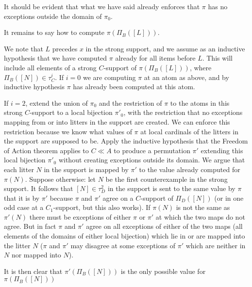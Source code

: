 \documentclass[12pt]{article}
\begin{document}
It should be evident that what we have said already enforces that $\pi$ has no exceptions outside the domain of $\pi_0$.

It remains to say how to compute $\pi(\Pi_B([L]))$.

We note that $L$ precedes $x$ in the strong support, and we assume as an inductive hypothesis that we have computed $\pi$ already for all items before $L$.
This will include all elements of a strong $C$-support of $\pi(\Pi_B([L]))$, where $\Pi_B([N]) \in \tau^i_C$.  If $i=0$ we are computing $\pi$ at an atom as above, and
by inductive hypothesis $\pi$ has already been computed at this atom.

If $i=2$, extend the union of $\pi_0$ and the restriction of $\pi$ to the atoms in this strong $C$-support to a local bijection $\pi'_0$, with the restriction
that no exceptions mapping from or into litters in the support are created.  We can enforce this restriction because we know what values of $\pi$ at local cardinals of the litters in the support are supposed to be.  Apply the inductive hypothesis that the Freedom of Action theorem applies to $C\ll A$ to produce
a permutation $\pi'$ extending this local bijection $\pi'_0$ without creating exceptions outside its domain.   We argue that each litter $N$ in the support is mapped by $\pi'$ to the value
already computed for $\pi(N)$.  Suppose otherwise:  let $N$ be the first counterexample in the strong support.  It follows that $[N]\in \tau^2_D$ in the support is sent to the same value by $\pi$ that it is by $\pi'$ because $\pi$ and $\pi'$ agree on a $C$-support of $\Pi_D([N])$ (or in one odd case at a $C_1$-support, but this also works).  If $\pi(N)$ is not the same as $\pi'(N)$ there must be exceptions of either $\pi$ or $\pi'$ at which the two maps do not agree.  But in fact $\pi$ and $\pi'$ agree on all exceptions of either of the two maps (all elements of the domains of either local bijection) which lie in or are mapped into the litter $N$ ($\pi$ and $\pi'$ may disagree at some exceptions of $\pi'$ which are neither in $N$ nor mapped into $N$).

It is then clear that $\pi'(\Pi_B([N]))$ is the only possible value for  $\pi(\Pi_B([N]))$
\end{document}
